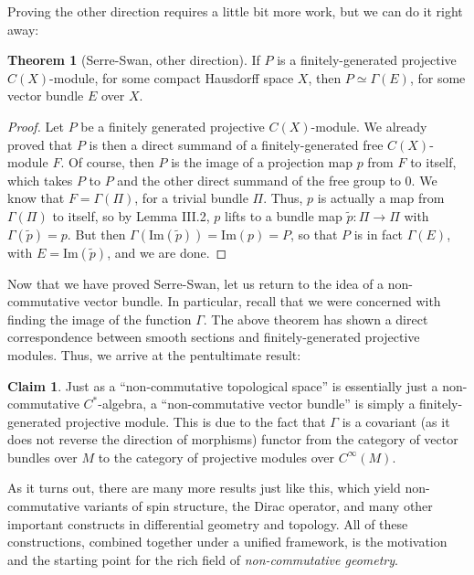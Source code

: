 \documentclass[aps,pra,showpacs,notitlepage,onecolumn,superscriptaddress,nofootinbib]{revtex4-1}
\theoremstyle{definition}
\newtheorem{theorem}{Theorem}[section]
\newtheorem{claim}{Claim}[section]
\newcommand{\hhrulefill}{\hspace{-1.5em} \hrulefill}
\begin{document}
Proving the other direction requires a little bit more work, but we can do it right away:

\begin{theorem}[Serre-Swan, other direction]
If $P$ is a finitely-generated projective $C(X)$-module, for some compact Hausdorff space $X$, then $P \simeq \Gamma(E)$, for some vector bundle $E$ over $X$.
\end{theorem}

\begin{proof}
  Let $P$ be a finitely generated projective $C(X)$-module. We already proved that $P$ is then a direct summand of a finitely-generated free $C(X)$-module $F$.
  Of course, then $P$ is the image of a projection map $p$ from $F$ to itself, which takes $P$ to $P$ and the other direct summand of the free group to $0$.
  We know that $F = \Gamma(\Pi)$, for a trivial bundle $\Pi$. Thus, $p$ is actually a map from $\Gamma(\Pi)$ to itself, so by Lemma III.2, $p$ lifts
  to a bundle map $\widetilde{p} : \Pi \rightarrow \Pi$ with $\Gamma(\widetilde{p}) = p$. But then $\Gamma(\text{Im}(\widetilde{p})) = \text{Im}(p) = P$,
  so that $P$ is in fact $\Gamma(E)$, with $E = \text{Im}(\widetilde{p})$, and we are done.
  \end{proof}

\hhrulefill

\noindent Now that we have proved Serre-Swan, let us return to the idea of a non-commutative vector bundle. In particular, recall
that we were concerned with finding the image of the function $\Gamma$. The above theorem has shown a direct correspondence between
smooth sections and finitely-generated projective modules. Thus, we arrive at the pentultimate result:

\begin{claim}
  Just as a ``non-commutative topological space'' is essentially just a non-commutative $C^{*}$-algebra, a ``non-commutative vector bundle''
  is simply a finitely-generated projective module. This is due to the fact that $\Gamma$ is a covariant (as it does not reverse the direction of morphisms)
  functor from the category of vector bundles over $M$ to the category of projective modules over $C^{\infty}(M)$.
\end{claim}

As it turns out, there are many more results just like this, which yield non-commutative variants of spin structure, the Dirac operator,
and many other important constructs in differential geometry and topology. All of these constructions, combined together under a unified
framework, is the motivation and the starting point for the rich field of \emph{non-commutative geometry}.
\end{document}
